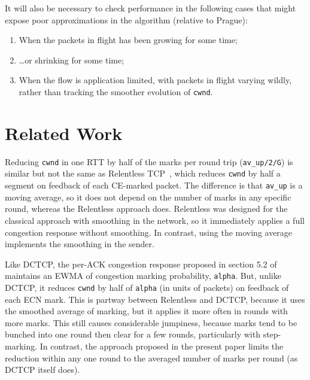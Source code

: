 It will also be necessary to check performance in the following cases that might
expose poor approximations in the algorithm (relative to Prague):
\begin{enumerate}
	\item When the packets in flight has been growing for some time;
	\item \ldots{}or shrinking for some time;
	\item When the flow is application limited, with packets in flight varying
	wildly, rather than tracking the smoother evolution of \texttt{cwnd}.
\end{enumerate}


\section{Related Work}\label{prresp_related}
\balance
Reducing \texttt{cwnd} in one RTT by half of the marks per round trip
(\texttt{av\_up/2/G}) is similar but not the same as Relentless
TCP~\cite{Mathis09:Relentless}, which reduces \texttt{cwnd} by half a segment on
feedback of each CE-marked packet. The difference is that \texttt{av\_up} is a
moving average, so it does not depend on the number of marks in any specific
round, whereas the Relentless approach does. Relentless was designed for the
classical approach with smoothing in the network, so it immediately applies a
full congestion response without smoothing. In contrast, using the moving
average implements the smoothing in the sender.

Like DCTCP, the per-ACK congestion response proposed in section 5.2 of
\cite{Alizadeh11:DCTCP_Analysis} maintains an EWMA of congestion marking
probability, \texttt{alpha}. But, unlike DCTCP, it reduces \texttt{cwnd} by half
of \texttt{alpha} (in units of packets) on feedback of each ECN mark. This is
partway between Relentless and DCTCP, because it uses the smoothed average of
marking, but it applies it more often in rounds with more marks. This still
causes considerable jumpiness, because marks tend to be bunched into one round
then clear for a few rounds, particularly with step-marking. In contrast, the
approach proposed in the present paper limits the reduction within any one round
to the averaged number of marks per round (as DCTCP itself does). %

